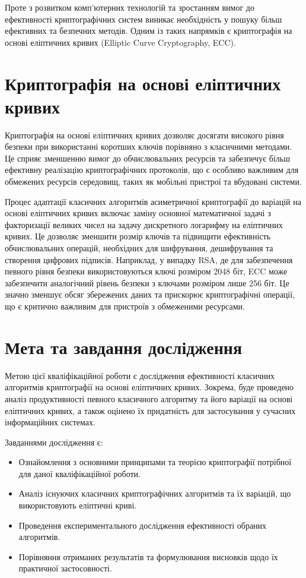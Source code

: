 \documentclass[12pt]{report}
\theoremstyle{definition}
\theoremstyle{plain}
\begin{document}
Проте з розвитком комп’ютерних технологій та зростанням вимог до ефективності криптографічних систем виникає необхідність у пошуку більш ефективних та безпечних методів. Одним із таких напрямків є криптографія на основі еліптичних кривих (Elliptic Curve Cryptography, ECC).

\section{Криптографія на основі еліптичних кривих}

Криптографія на основі еліптичних кривих дозволяє досягати високого рівня безпеки при використанні коротших ключів порівняно з класичними методами. Це сприяє зменшенню вимог до обчислювальних ресурсів та забезпечує більш ефективну реалізацію криптографічних протоколів, що є особливо важливим для обмежених ресурсів середовищ, таких як мобільні пристрої та вбудовані системи. 

Процес адаптації класичних алгоритмів асиметричної криптографії до варіацій на основі еліптичних кривих включає заміну основної математичної задачі з факторизації великих чисел на задачу дискретного логарифму на еліптичних кривих. Це дозволяє зменшити розмір ключів та підвищити ефективність обчислювальних операцій, необхідних для шифрування, дешифрування та створення цифрових підписів. Наприклад, у випадку RSA, де для забезпечення певного рівня безпеки використовуються ключі розміром 2048 біт, ECC може забезпечити аналогічний рівень безпеки з ключами розміром лише 256 біт. Це значно зменшує обсяг збережених даних та прискорює криптографічні операції, що є критично важливим для пристроїв з обмеженими ресурсами.

\section{Мета та завдання дослідження}

Метою цієї кваліфікаційної роботи є дослідження ефективності класичних алгоритмів криптографії на основі еліптичних кривих. Зокрема, буде проведено аналіз продуктивності певного класичного алгоритму та його варіації на основі еліптичних кривих, а також оцінено їх придатність для застосування у сучасних інформаційних системах.

Завданнями дослідження є:

\begin{itemize}
    \item Ознайомлення з основними принципами та теорією криптографії потрібної для даної кваліфікаційної роботи.
    \item Аналіз існуючих класичних криптографічних алгоритмів та їх варіацій, що використовують еліптичні криві.
    \item Проведення експериментального дослідження ефективності обраних алгоритмів.
    \item Порівняння отриманих результатів та формулювання висновків щодо їх практичної застосовності.
\end{itemize}
\end{document}
